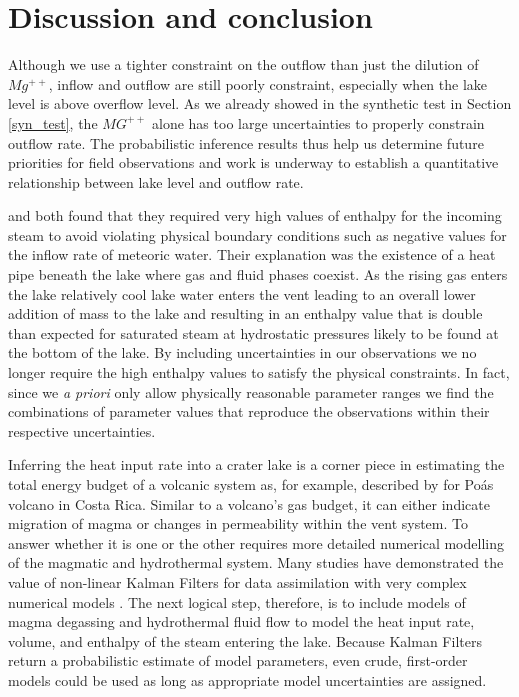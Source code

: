 \documentclass{bmc_template/bmcart}
\begin{document}
\section*{Discussion and conclusion}
Although we use a tighter constraint on the
outflow than just the dilution of $Mg^{++}$, inflow and outflow are still
poorly constraint, especially when the lake level is above overflow level. As we already
showed in the synthetic test in Section \ref{syn_test}, the $MG^{++}$ alone has
too large uncertainties to properly constrain outflow rate. The probabilistic
inference results thus help us determine future priorities for field
observations and work is underway to establish a quantitative relationship
between lake level and outflow rate.

\cite{hurstCraterLakeEnergy2015} and \cite{Stevenson1991} both found that they required very
high values of enthalpy for the incoming steam to avoid violating physical
boundary conditions such as negative values for the inflow rate of meteoric
water. Their explanation was the existence of a heat pipe beneath the lake where
gas and fluid phases coexist. As the rising gas enters the lake relatively cool
lake water enters the vent leading to an overall lower addition of mass to the
lake and resulting in an enthalpy value that is double than expected for
saturated steam at hydrostatic pressures likely to be found at the bottom of the
lake. By including uncertainties in our observations we no longer require the
high enthalpy values to satisfy the physical constraints. In fact, since we \textit{a
priori} only allow physically reasonable parameter ranges we find the
combinations of parameter values that reproduce the observations within their
respective uncertainties. 

Inferring the heat input rate into a crater lake is a corner piece in estimating the
total energy budget of a volcanic system as, for example, described by \cite{Adams1989a}
for Po\'as volcano in Costa Rica. Similar to a volcano's gas budget, it can either
indicate migration of magma or changes in permeability within the vent system. To
answer whether it is one or the other requires more detailed numerical modelling
of the magmatic and hydrothermal system. Many studies have demonstrated the 
value of non-linear Kalman Filters for data assimilation with very complex numerical 
models \citep{}. The next logical step, therefore, is to include models of magma
degassing and hydrothermal fluid flow to model the heat input rate, volume, and
enthalpy of the steam entering the lake. Because Kalman Filters return a probabilistic
estimate of model parameters, even crude, first-order models could be used
as long as appropriate model uncertainties are assigned.
\end{document}
